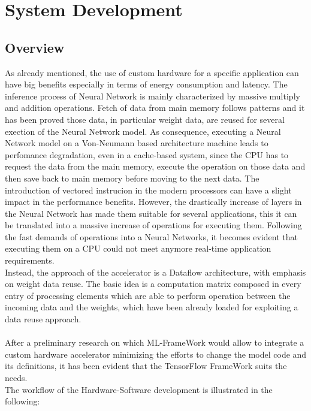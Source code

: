 \chapter{System Development}

\section{Overview}
As already mentioned, the use of custom hardware for a specific application can have big benefits especially in terms of energy consumption and latency.
The inference process of Neural Network is mainly characterized by massive multiply and addition operations. Fetch of data from main memory follows patterns and it has been proved those data, in particular weight data, are reused for several exection of the Neural Network model.
As consequence, executing a Neural Network model on a Von-Neumann based architecture machine leads to perfomance degradation, even in a cache-based system, since the CPU has to request the data from the main memory, execute the operation on those data and then save back to main memory before moving to the next data. The introduction of vectored instrucion in the modern processors can have a slight impact in the performance benefits. However, the drastically increase of layers in the Neural Network has made them suitable for several applications, this it can be translated into a massive increase of operations for executing them. Following the fast demands of operations into a Neural Networks, it becomes evident that executing them on a CPU could not meet anymore real-time application requirements.\\
Instead, the approach of the accelerator is a Dataflow architecture, with emphasis on weight data reuse. The basic idea is a computation matrix composed in every entry of processing elements which are able to perform operation between the incoming data and the weights, which have been already loaded for exploiting a data reuse approach.\\\\
After a preliminary research on which ML-FrameWork would allow to integrate a custom hardware accelerator minimizing the efforts to change the model code and its definitions, it has been evident that the TensorFlow FrameWork suits the needs.\\
\newpage
The workflow of the Hardware-Software development is illustrated in the following:

